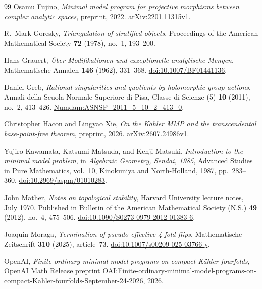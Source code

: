 \begin{thebibliography}{99}
Osamu Fujino,
\emph{Minimal model program for projective morphisms between complex
analytic spaces},
preprint, 2022.
\href{https://arxiv.org/abs/2201.11315v1}{arXiv:2201.11315v1}.

R.~Mark Goresky,
\emph{Triangulation of stratified objects},
Proceedings of the American Mathematical Society
\textbf{72} (1978), no.~1, 193--200.

Hans Grauert,
\emph{\"Uber Modifikationen und exzeptionelle analytische Mengen},
Mathematische Annalen \textbf{146} (1962), 331--368.
\href{https://doi.org/10.1007/BF01441136}{doi:10.1007/BF01441136}.

Daniel Greb,
\emph{Rational singularities and quotients by holomorphic group actions},
Annali della Scuola Normale Superiore di Pisa, Classe di Scienze (5)
\textbf{10} (2011), no.~2, 413--426.
\href{https://www.numdam.org/item/ASNSP_2011_5_10_2_413_0/}{Numdam:ASNSP\_2011\_5\_10\_2\_413\_0}.

Christopher Hacon and Lingyao Xie,
\emph{On the K\"ahler MMP and the transcendental base-point-free theorem},
preprint, 2026.
\href{https://arxiv.org/abs/2607.24986v1}{arXiv:2607.24986v1}.

Yujiro Kawamata, Katsumi Matsuda, and Kenji Matsuki,
\emph{Introduction to the minimal model problem},
in \emph{Algebraic Geometry, Sendai, 1985},
Advanced Studies in Pure Mathematics, vol.~10,
Kinokuniya and North-Holland, 1987, pp.~283--360.
\href{https://doi.org/10.2969/aspm/01010283}{doi:10.2969/aspm/01010283}.

John Mather,
\emph{Notes on topological stability},
Harvard University lecture notes, July 1970.
Published in Bulletin of the American Mathematical Society (N.S.)
\textbf{49} (2012), no.~4, 475--506.
\href{https://doi.org/10.1090/S0273-0979-2012-01383-6}{doi:10.1090/S0273-0979-2012-01383-6}.

Joaqu\'in Moraga,
\emph{Termination of pseudo-effective 4-fold flips},
Mathematische Zeitschrift \textbf{310} (2025), article~73.
\href{https://doi.org/10.1007/s00209-025-03766-y}{doi:10.1007/s00209-025-03766-y}.

OpenAI,
\emph{Finite ordinary minimal model programs on compact K\"ahler fourfolds},
OpenAI Math Release preprint
\href{https://github.com/openai/math/blob/main/preprints/Finite-ordinary-minimal-model-programs-on-compact-Kahler-fourfolds-September-24-2026/paper.pdf}{OAI:Finite-ordinary-minimal-model-programs-on-compact-Kahler-fourfolds-September-24-2026},
2026.


\end{thebibliography}
